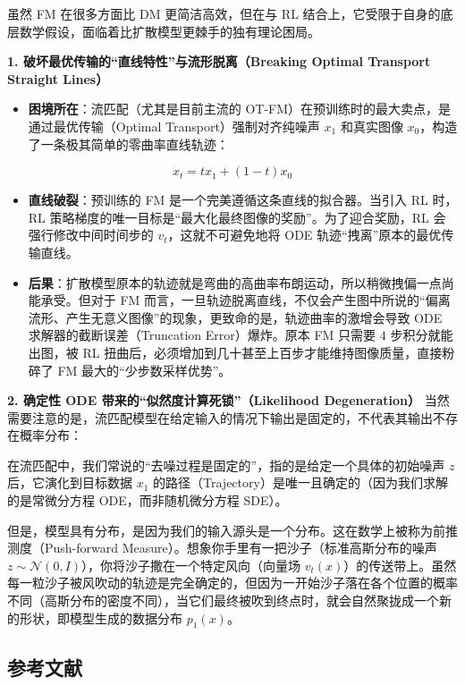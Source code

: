 虽然 FM 在很多方面比 DM 更简洁高效，但在与 RL 结合上，它受限于自身的底层数学假设，面临着比扩散模型更棘手的独有理论困局。

\textbf{1. 破坏最优传输的``直线特性''与流形脱离（Breaking Optimal Transport Straight Lines）}

\begin{itemize}
\tightlist
\item
  \textbf{困境所在}：流匹配（尤其是目前主流的 OT-FM）在预训练时的最大卖点，是通过最优传输（Optimal Transport）强制对齐纯噪声 \(x_1\) 和真实图像 \(x_0\)，构造了一条极其简单的零曲率直线轨迹：
\end{itemize}

\[
x_t = tx_1 + (1 - t)x_0
\]

\begin{itemize}
\tightlist
\item
  \textbf{直线破裂}：预训练的 FM 是一个完美遵循这条直线的拟合器。当引入 RL 时，RL 策略梯度的唯一目标是``最大化最终图像的奖励''。为了迎合奖励，RL 会强行修改中间时间步的 \(v_t\)，这就不可避免地将 ODE 轨迹``拽离''原本的最优传输直线。
\item
  \textbf{后果}：扩散模型原本的轨迹就是弯曲的高曲率布朗运动，所以稍微拽偏一点尚能承受。但对于 FM 而言，一旦轨迹脱离直线，不仅会产生图中所说的``偏离流形、产生无意义图像''的现象，更致命的是，轨迹曲率的激增会导致 ODE 求解器的截断误差（Truncation Error）爆炸。原本 FM 只需要 \(4\) 步积分就能出图，被 RL 扭曲后，必须增加到几十甚至上百步才能维持图像质量，直接粉碎了 FM 最大的``少步数采样优势''。
\end{itemize}

\textbf{2. 确定性 ODE 带来的``似然度计算死锁''（Likelihood Degeneration）}
当然需要注意的是，流匹配模型在给定输入的情况下输出是固定的，不代表其输出不存在概率分布：

在流匹配中，我们常说的``去噪过程是固定的''，指的是给定一个具体的初始噪声 \(z\) 后，它演化到目标数据 \(x_1\) 的路径（Trajectory）是唯一且确定的（因为我们求解的是常微分方程 ODE，而非随机微分方程 SDE）。

但是，模型具有分布，是因为我们的输入源头是一个分布。这在数学上被称为前推测度（Push-forward Measure）。想象你手里有一把沙子（标准高斯分布的噪声 \(z \sim \mathcal{N}(0, I)\)），你将沙子撒在一个特定风向（向量场 \(v_t(x)\)）的传送带上。虽然每一粒沙子被风吹动的轨迹是完全确定的，但因为一开始沙子落在各个位置的概率不同（高斯分布的密度不同），当它们最终被吹到终点时，就会自然聚拢成一个新的形状，即模型生成的数据分布 \(p_1(x)\)。

\hypertarget{ux53c2ux8003ux6587ux732e-164}{%
\subsection{参考文献}\label{ux53c2ux8003ux6587ux732e-164}}

